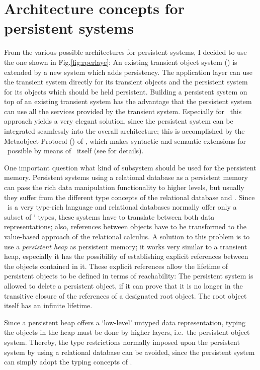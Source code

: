 \documentclass[a4paper%
]{article}
\newcommand\showfigrule{0pt}
\renewcommand\figurename{Fig.}
\begin{document}
\section{Architecture concepts for persistent systems}
%
\begin{figwindow}[2,r,{\rule{\showfigrule}{7\baselineskip}%
                       \psfig{figure=tenpt/rperlaye.eps}},%
                 {Persistent system architecture%
                  \label{fig:rperlaye}}]
%
\noindent%
From the various possible architectures for persistent systems, I
decided to use the one shown in \figurename{\ref{fig:rperlaye}}:
An existing transient object system (\clos) is extended by a new
system which adds persistency. The application layer can use the
transient system directly for its transient objects and the persistent
system for its objects which should be held persistent. Building a
persistent system on top of an existing transient system has the
advantage that the persistent system can use all the services
provided by the transient system. Especially for \clos\ this approach
yields a very elegant solution, since the persistent system can be
integrated seamlessly into the overall architecture; this is
accomplished by the Metaobject Protocol (\mop) of \clos, which makes
syntactic and semantic extensions for \clos\ possible by means
of \clos\ itself (see \cite{bib:amop91,bib:st90} for details).
\end{figwindow}%
%
\par{}One important question what kind of subsystem should be used
for the persistent memory. Persistent systems using a relational
database as a persistent memory can pass the rich data manipulation
functionality to higher levels, but usually they suffer from the
different type concepts of the relational database and \clos.  Since
\clos\ is a very type-rich language and relational databases
normally offer only a subset of \clos' types, these systems have to
translate between both data representations; also, references between
objects have to be transformed to the value-based approach of the
relational calculus. A solution to this problem is to use a
\emph{persistent heap} as persistent memory; it works very similar to
a transient heap, especially it has the possibility of establishing
explicit references between the objects contained in it. These
explicit references allow the lifetime of persistent objects to be
defined in terms of reachability: The persistent system is allowed to
delete a persistent object, if it can prove that it is no longer in
the transitive closure of the references of a designated root
object. The root object itself has an infinite lifetime.
%
\par{}Since a persistent heap offers a `low-level' untyped data
representation, typing the objects in the heap must be done by higher
layers, i.e.\ the persistent object system. Thereby, the type
restrictions normally imposed upon the persistent system by using a
relational database can be avoided, since the persistent system can
simply adopt the typing concepts of \clos.
%
\end{document}
